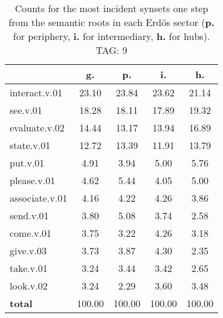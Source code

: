 \begin{table}[h!]
\begin{center}
\begin{tabular}{| l | c | c | c | c |}\hline
 & g. & p. & i. & h. \\\hline
interact.v.01 & 23.10  & 23.84  & 23.62  & 21.14 \\\hline
see.v.01 & 18.28  & 18.11  & 17.89  & 19.32 \\\hline
evaluate.v.02 & 14.44  & 13.17  & 13.94  & 16.89 \\\hline
state.v.01 & 12.72  & 13.39  & 11.91  & 13.79 \\\hline
put.v.01 & 4.91  & 3.94  & 5.00  & 5.76 \\\hline
please.v.01 & 4.62  & 5.44  & 4.05  & 5.00 \\\hline
associate.v.01 & 4.16  & 4.22  & 4.26  & 3.86 \\\hline
send.v.01 & 3.80  & 5.08  & 3.74  & 2.58 \\\hline
come.v.01 & 3.75  & 3.22  & 4.26  & 3.18 \\\hline
give.v.03 & 3.73  & 3.87  & 4.30  & 2.35 \\\hline
take.v.01 & 3.24  & 3.44  & 3.42  & 2.65 \\\hline
look.v.02 & 3.24  & 2.29  & 3.60  & 3.48 \\\hline
{{\bf total}} & 100.00  & 100.00  & 100.00  & 100.00 \\\hline
\end{tabular}
\caption{Counts for the most incident synsets one step from the semantic roots in each Erd\"os sector ({\bf p.} for periphery, {\bf i.} for intermediary, {\bf h.} for hubs). TAG: 9}
\end{center}
\end{table}